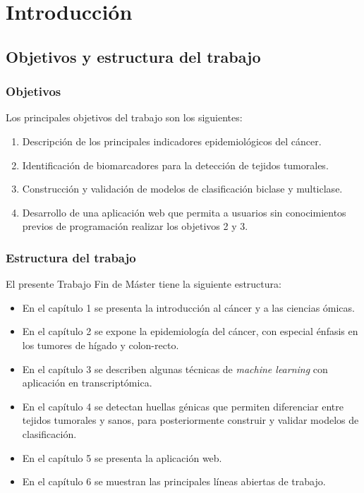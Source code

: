 \chapter{Introducción}

\section{Objetivos y estructura del trabajo}

\subsection{Objetivos}

Los principales objetivos del trabajo son los siguientes:

\begin{enumerate}
	\item Descripción de los principales indicadores epidemiológicos del cáncer.
	\item Identificación de biomarcadores para la detección de tejidos tumorales.
	\item Construcción y validación de modelos de clasificación biclase y multiclase.
	\item Desarrollo de una aplicación web que permita a usuarios sin conocimientos previos de programación realizar los objetivos 2 y 3.
\end{enumerate}
	
\subsection{Estructura del trabajo}

El presente Trabajo Fin de Máster tiene la siguiente estructura:
 
\begin{itemize}
	\item En el capítulo 1 se presenta la introducción al cáncer y a las ciencias ómicas.
	\item En el capítulo 2 se expone la epidemiología del cáncer, con especial énfasis en los tumores de hígado y colon-recto.
	\item En el capítulo 3 se describen algunas técnicas de \textit{machine learning} con aplicación en transcriptómica.
	\item En el capítulo 4 se detectan huellas génicas que permiten diferenciar entre tejidos tumorales y sanos, para posteriormente construir y validar modelos de clasificación.
	\item En el capítulo 5 se presenta la aplicación web.
	\item En el capítulo 6 se muestran las principales líneas abiertas de trabajo.
\end{itemize}

